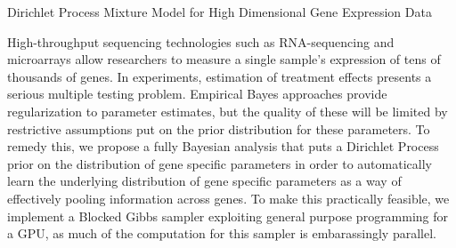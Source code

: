 Dirichlet Process Mixture Model for High Dimensional Gene Expression Data

High-throughput sequencing technologies such as RNA-sequencing and microarrays allow researchers to measure a single sample's expression of tens of thousands of genes. In experiments, estimation of treatment effects presents a serious multiple testing problem. Empirical Bayes approaches provide regularization to parameter estimates, but the quality of these will be limited by restrictive assumptions put on the prior distribution for these parameters. To remedy this, we propose a fully Bayesian analysis that puts a Dirichlet Process prior on the distribution of gene specific parameters in order to automatically learn the underlying distribution of gene specific parameters as a way of effectively pooling information across genes. To make this practically feasible, we implement a Blocked Gibbs sampler exploiting general purpose programming for a GPU, as much of the computation for this sampler is embarassingly parallel.